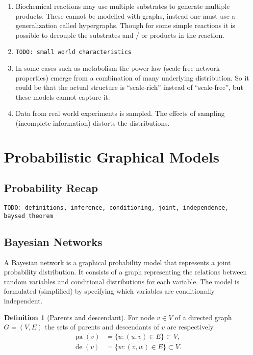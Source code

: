 \documentclass[a4paper]{article}
\newcommand{\todo}[1]{\texttt{TODO: #1}}
\DeclareMathOperator{\pa}{pa} %
\DeclareMathOperator{\de}{de} %
\theoremstyle{plain}
\theoremstyle{definition}
\newtheorem{defn}{Definition}[section]
\theoremstyle{remark}
\begin{document}
\begin{enumerate}
  \item Biochemical reactions may use multiple substrates to generate multiple
    products. These cannot be modelled with graphs, instead one must use
    a generalization called hypergraphs. Though for some simple reactions it
    is possible to decouple the substrates and / or products in the reaction.

  \item \todo{small world characteristics}

  \item In some cases such as metabolism the power law (scale-free network
    properties) emerge from a combination of many underlying distribution. So
    it could be that the actual structure is ``scale-rich'' instead of
    ``scale-free'', but these models cannot capture it.

  \item Data from real world experiments is sampled. The effects of sampling
    (incomplete information) distorts the distributions.

\end{enumerate}


\section{Probabilistic Graphical Models}

\subsection{Probability Recap}

\todo{definitions, inference, conditioning, joint, independence, baysed
theorem}

\subsection{Bayesian Networks}

A Bayesian network is a graphical probability model that represents a joint
probability distribution. It consists of a graph representing the relations
between random variables and conditional distributions for each variable. The
model is formulated (simplified) by specifying which variables are
conditionally independent.

\begin{defn}[Parents and descendant]
  For node $v \in V$ of a directed graph $G = (V, E)$ the sets of parents and
  descendants of $v$ are respectively
  \begin{align*}
    \pa(v) &= \{u : (u,v) \in E\} \subset V, \\
    \de(v) &= \{w : (v,w) \in E\} \subset V.
  \end{align*}
\end{defn}
\end{document}
